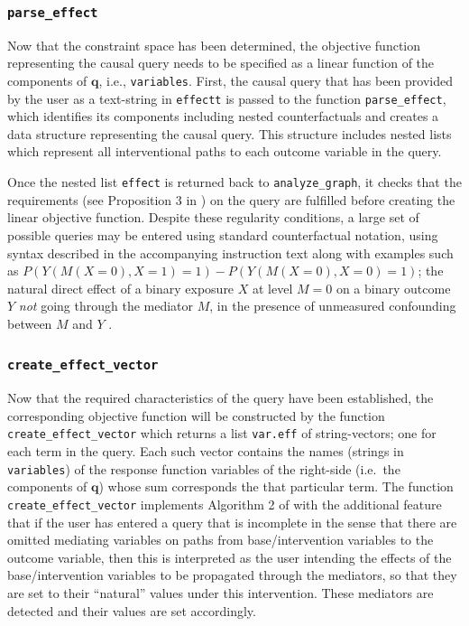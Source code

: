 \hypertarget{parse_effect}{%
\subsubsection{\texorpdfstring{\texttt{parse\_effect}}{parse\_effect}}\label{parse_effect}}

Now that the constraint space has been determined, the objective function representing the causal query needs to be specified as a linear function of the components of \(\mathbf{q}\), i.e., \texttt{variables}. First, the causal query that has been provided by the user as a text-string in \texttt{effectt} is passed to the function \texttt{parse\_effect}, which identifies its components including nested counterfactuals and creates a data structure representing the causal query. This structure includes nested lists which represent all interventional paths to each outcome variable in the query.

Once the nested list \texttt{effect} is returned back to \texttt{analyze\_graph}, it checks that the requirements (see Proposition 3 in \citet{generalcausalbounds}) on the query are fulfilled before creating the linear objective function. Despite these regularity conditions, a large set of possible queries may be entered using standard counterfactual notation, using syntax described in the accompanying instruction text along with examples such as \(P(Y(M(X = 0), X = 1) = 1) - P(Y(M(X = 0), X = 0) = 1)\); the natural direct effect \citep{pearl2001direct} of a binary exposure \(X\) at level \(M=0\) on a binary outcome \(Y\) \emph{not} going through the mediator \(M\), in the presence of unmeasured confounding between \(M\) and \(Y\) \citep{sjolander2009bounds}.

\hypertarget{create_effect_vector}{%
\subsubsection{\texorpdfstring{\texttt{create\_effect\_vector}}{create\_effect\_vector}}\label{create_effect_vector}}

Now that the required characteristics of the query have been established, the corresponding objective function will be constructed by the function \texttt{create\_effect\_vector} which returns a list \texttt{var.eff} of string-vectors; one for each term in the query. Each such vector contains the names (strings in \texttt{variables}) of the response function variables of the right-side (i.e.~the components of \(\mathbf{q}\)) whose sum corresponds the that particular term.
The function \texttt{create\_effect\_vector} implements Algorithm 2 of \citet{generalcausalbounds} with the additional feature that
if the user has entered a query that is incomplete in the sense that there are omitted mediating variables on paths from base/intervention variables to the outcome variable, then this is interpreted as the user intending the effects of the base/intervention variables to be propagated through the mediators, so that they are set to their ``natural'' values under this intervention. These mediators are detected and their values are set accordingly.

